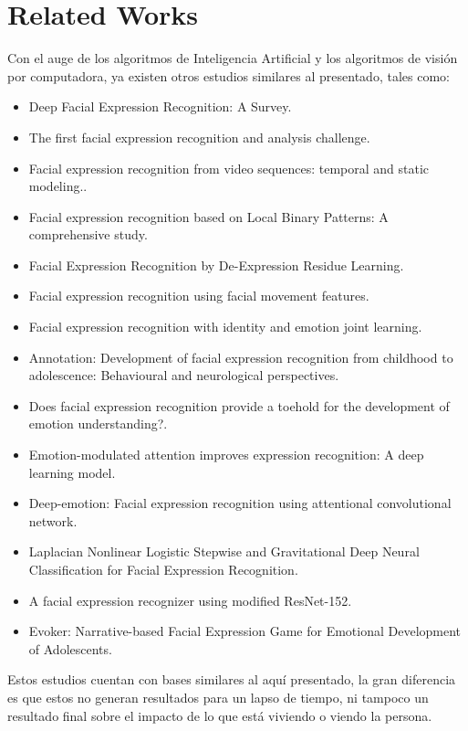 
\section{Related Works}

Con el auge de los algoritmos de Inteligencia Artificial y los algoritmos de
visión por computadora, ya existen otros estudios similares al presentado,
tales como:
\begin{itemize}
      \item Deep Facial Expression Recognition: A Survey\cite[]{li2020deep}.
      \item The first facial expression recognition and analysis
            challenge\cite[]{valstar2011first}.
      \item Facial expression recognition from video sequences: temporal and static
            modeling.\cite[]{cohen2003facial}.
      \item Facial expression recognition based on Local Binary Patterns: A comprehensive
            study\cite[]{shan2009facial}.
      \item Facial Expression Recognition by De-Expression Residue
            Learning\cite[]{yang2018facial}.
      \item Facial expression recognition using facial movement
            features\cite[]{zhang2011facial}.
      \item Facial expression recognition with identity and emotion joint
            learning\cite[]{li2018facial}.
      \item Annotation: Development of facial expression recognition from childhood to
            adolescence: Behavioural and neurological
            perspectives\cite[]{herba2004annotation}.
      \item Does facial expression recognition provide a toehold for the development of
            emotion understanding?\cite[]{strand2016does}.
      \item Emotion-modulated attention improves expression recognition: A deep learning
            model\cite[]{barros2017emotion}.
      \item Deep-emotion: Facial expression recognition using attentional convolutional
            network\cite[]{minaee2021deep}.
      \item Laplacian Nonlinear Logistic Stepwise and Gravitational Deep Neural
            Classification for Facial Expression
            Recognition\cite[]{kumari4096801laplacian}.
      \item A facial expression recognizer using modified ResNet-152\cite[]{xu2022facial}.
      \item Evoker: Narrative-based Facial Expression Game for Emotional Development of
            Adolescents\cite[]{hong2022evoker}.

\end{itemize}
Estos estudios cuentan con bases similares al aquí presentado, la gran diferencia es que estos
no generan resultados para un lapso de tiempo, ni tampoco un resultado final sobre el impacto
de lo que está viviendo o viendo la persona.